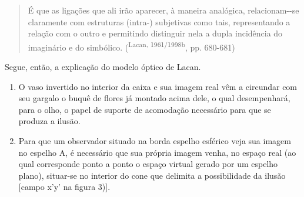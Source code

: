 \begin{multicols}{2}
\par
\begin{quote}\par{}É que as ligações que ali irão aparecer,\allowbreak{} à maneira analógica,\allowbreak{} relacionam-\allowbreak{}-\allowbreak{}se claramente com estruturas (\allowbreak{}intra-\allowbreak{})\allowbreak{} subjetivas como tais,\allowbreak{} representando a relação com o outro e permitindo distinguir nela a dupla incidência do imaginário e do simbólico.\allowbreak{} (\allowbreak{}\textsuperscript{Lacan,\allowbreak{} 1961\fshyp{}1998b},\allowbreak{} pp.\allowbreak{} 680-\allowbreak{}681)\allowbreak{}\end{quote}\par{}Segue,\allowbreak{} então,\allowbreak{} a explicação do modelo óptico de Lacan.\allowbreak{}
\begin{enumerate}[label=\arabic*,leftmargin=*]
\item \par{}O vaso invertido no interior da caixa e sua imagem real vêm a circundar com seu gargalo o buquê de flores já montado acima dele,\allowbreak{} o qual desempenhará,\allowbreak{} para o olho,\allowbreak{} o papel de suporte de acomodação necessário para que se produza a ilusão.\allowbreak{}
\item \par{}Para que um observador situado na borda espelho esférico veja sua imagem no espelho A,\allowbreak{} é necessário que sua própria imagem venha,\allowbreak{} no espaço real (\allowbreak{}ao qual corresponde ponto a ponto o espaço virtual gerado por um espelho plano)\allowbreak{},\allowbreak{} situar-\allowbreak{}se no interior do cone que delimita a possibilidade da ilusão [campo x’y’ na figura 3)\allowbreak{}].\allowbreak{}
\end{enumerate}



\end{multicols}
